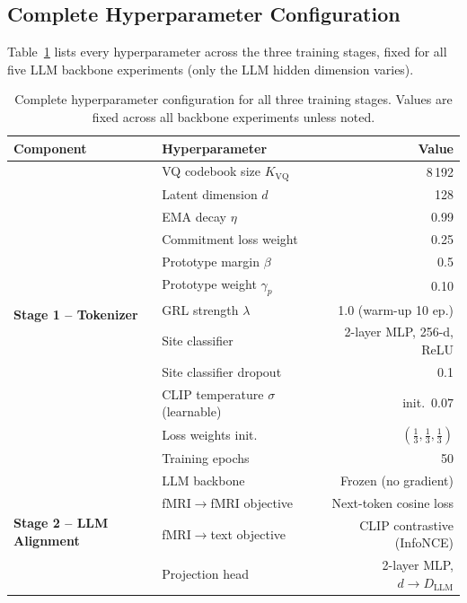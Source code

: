 \documentclass[runningheads]{llncs}
\begin{document}
\subsection{Complete Hyperparameter Configuration}
Table~\ref{tab:hyperparams} lists every hyperparameter across the three training stages, fixed for all five LLM backbone experiments (only the LLM hidden dimension varies).
\begin{table}[htbp]
\centering
\caption{Complete hyperparameter configuration for all three training stages. Values are fixed across all backbone experiments unless noted.}
\label{tab:hyperparams}
\setlength{\tabcolsep}{4pt}
\small
\begin{tabular}{llr}
\toprule
\textbf{Component} & \textbf{Hyperparameter} & \textbf{Value} \\
\midrule
\multirow{12}{*}{\textbf{Stage 1 -- Tokenizer}}
 & VQ codebook size $K_{\mathrm{VQ}}$         & 8\,192 \\
 & Latent dimension $d$                        & 128 \\
 & EMA decay $\eta$                            & 0.99 \\
 & Commitment loss weight                      & 0.25 \\
 & Prototype margin $\beta$                    & 0.5 \\
 & Prototype weight $\gamma_p$                 & 0.10 \\
 & GRL strength $\lambda$                      & 1.0 (warm-up 10 ep.) \\
 & Site classifier                             & 2-layer MLP, 256-d, ReLU \\
 & Site classifier dropout                     & 0.1 \\
 & CLIP temperature $\sigma$ (learnable)       & init.\ $0.07$ \\
 & Loss weights init.                          & $(\tfrac13,\tfrac13,\tfrac13)$ \\
 & Training epochs                             & 50 \\
\midrule
\multirow{6}{*}{\textbf{Stage 2 -- LLM Alignment}}
 & LLM backbone                                & Frozen (no gradient) \\
 & fMRI$\to$fMRI objective                     & Next-token cosine loss \\
 & fMRI$\to$text objective                     & CLIP contrastive (InfoNCE) \\
 & Projection head                             & 2-layer MLP, $d\to D_{\mathrm{LLM}}$ \\

\end{tabular}
\end{table}
\end{document}
